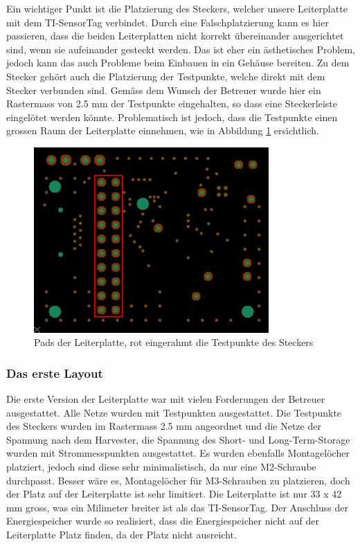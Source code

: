 \begin{minipage}{1\textwidth}
Ein wichtiger Punkt ist die Platzierung des Steckers, welcher unsere Leiterplatte mit dem TI-SensorTag verbindet. Durch eine Falschplatzierung kann es hier passieren, dass die beiden Leiterplatten nicht korrekt übereinander ausgerichtet sind, wenn sie aufeinander gesteckt werden. Das ist eher ein ästhetisches Problem, jedoch kann das auch Probleme beim Einbauen in ein Gehäuse bereiten. Zu dem Stecker gehört auch die Platzierung der Testpunkte, welche direkt mit dem Stecker verbunden sind. Gemäss dem Wunsch der Betreuer wurde hier ein Rastermass von 2.5 mm der Testpunkte eingehalten, so dass eine Steckerleiste eingelötet werden könnte. Problematisch ist jedoch, dass die Testpunkte einen grossen Raum der Leiterplatte einnehmen, wie in Abbildung \ref{layout_testpunkteraster} ersichtlich.
\end{minipage}

\begin{figure}[ht]
    \includegraphics[width=0.8\textwidth]{3Vorgehen/imag/Layout_Testpunkteraster.png}
    \caption{Pads der Leiterplatte, rot eingerahmt die Testpunkte des Steckers}\label{layout_testpunkteraster} 
\end{figure}

\subsubsection{Das erste Layout}

Die erste Version der Leiterplatte war mit vielen Forderungen der Betreuer ausgestattet. Alle Netze wurden mit Testpunkten ausgestattet. Die Testpunkte des Steckers wurden im Rastermass 2.5 mm angeordnet und die Netze der Spannung nach dem Harvester, die Spannung des Short- und Long-Term-Storage wurden mit Strommesspunkten ausgestattet. Es wurden ebenfalls Montagelöcher platziert, jedoch sind diese sehr minimalistisch, da nur eine M2-Schraube durchpasst. Besser wäre es, Montagelöcher für M3-Schrauben zu platzieren, doch der Platz auf der Leiterplatte ist sehr limitiert. Die Leiterplatte ist nur 33 x 42 mm gross, was ein Milimeter breiter ist als das TI-SensorTag. Der Anschluss der Energiespeicher wurde so realisiert, dass die Energiespeicher nicht auf der Leiterplatte Platz finden, da der Platz nicht ausreicht.

